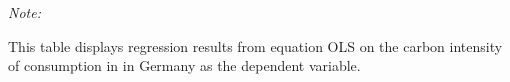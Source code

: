 \begin{table}[htbp!]
\begin{adjustbox}{width = 1\textwidth, max height = 0.95\textheight, center}
\begin{threeparttable}[b]
         \begin{tablenotes}\item \medskip \textit{Note:}
            \item This table displays regression results from equation OLS on the carbon intensity of consumption in  in Germany as the dependent variable. 
         \end{tablenotes}
      \end{threeparttable}
   \end{adjustbox}
\end{table}


